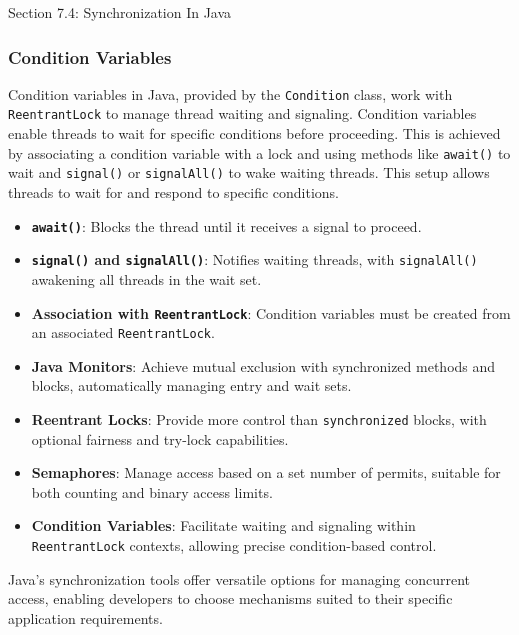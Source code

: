 \begin{notes}{Section 7.4: Synchronization In Java}
\begin{highlight}[Semaphores]
    \end{highlight}
    
    \subsubsection*{Condition Variables}
    
    Condition variables in Java, provided by the \texttt{Condition} class, work with \texttt{ReentrantLock} to manage thread waiting and signaling. Condition variables enable threads to wait for 
    specific conditions before proceeding. This is achieved by associating a condition variable with a lock and using methods like \texttt{await()} to wait and \texttt{signal()} or \texttt{signalAll()} 
    to wake waiting threads. This setup allows threads to wait for and respond to specific conditions.
    
    \begin{highlight}
    
        \begin{itemize}
            \item \textbf{\texttt{await()}}: Blocks the thread until it receives a signal to proceed.
            \item \textbf{\texttt{signal()} and \texttt{signalAll()}}: Notifies waiting threads, with \texttt{signalAll()} awakening all threads in the wait set.
            \item \textbf{Association with \texttt{ReentrantLock}}: Condition variables must be created from an associated \texttt{ReentrantLock}.
        \end{itemize}
    
    \end{highlight}
    
    \begin{highlight}
    
        \begin{itemize}
            \item \textbf{Java Monitors}: Achieve mutual exclusion with synchronized methods and blocks, automatically managing entry and wait sets.
            \item \textbf{Reentrant Locks}: Provide more control than \texttt{synchronized} blocks, with optional fairness and try-lock capabilities.
            \item \textbf{Semaphores}: Manage access based on a set number of permits, suitable for both counting and binary access limits.
            \item \textbf{Condition Variables}: Facilitate waiting and signaling within \texttt{ReentrantLock} contexts, allowing precise condition-based control.
        \end{itemize}
    
    Java's synchronization tools offer versatile options for managing concurrent access, enabling developers to choose mechanisms suited to their specific application requirements.
    
    \end{highlight}
\end{notes}


